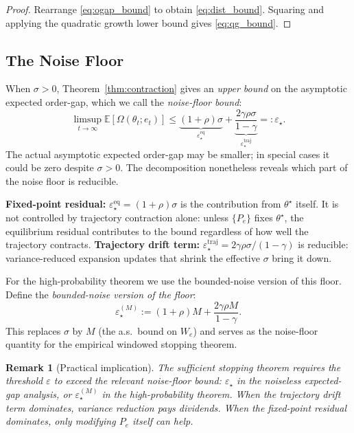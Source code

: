 \documentclass[12pt,a4paper]{article}
\newtheorem{remark}[definition]{Remark}
\newcommand{\Ogap}{\Omega}
\begin{document}
\begin{proof}
Rearrange \eqref{eq:ogap_bound} to obtain \eqref{eq:dist_bound}. Squaring
and applying the quadratic growth lower bound gives \eqref{eq:qg_bound}. \qedhere
\end{proof}

\subsection{The Noise Floor}
\label{sec:theory_noisefloor}

When $\sigma > 0$, Theorem~\ref{thm:contraction} gives an \emph{upper bound}
on the asymptotic expected order-gap, which we call the \emph{noise-floor bound}:
\[
  \limsup_{t \to \infty}
  \mathbb{E}[\Ogap(\theta_t; e_t)]
  \leq \underbrace{(1 + \rho)\sigma}_{\varepsilon_\star^{\text{eq}}}
  + \underbrace{\frac{2\gamma\rho\sigma}{1 - \gamma}}_{\varepsilon_\star^{\text{traj}}}
  =: \varepsilon_\star.
\]
The actual asymptotic expected order-gap may be smaller; in special cases it
could be zero despite $\sigma > 0$. The decomposition nonetheless reveals
which part of the noise floor is reducible.

\textbf{Fixed-point residual:}
$\varepsilon_\star^{\text{eq}} = (1+\rho)\sigma$ is the contribution from
$\theta^\star$ itself. It is not controlled by trajectory contraction alone:
unless $\{P_e\}$ fixes $\theta^\star$, the equilibrium residual contributes
to the bound regardless of how well the trajectory contracts.
\textbf{Trajectory drift term:} $\varepsilon_\star^{\text{traj}} =
2\gamma\rho\sigma/(1-\gamma)$ is reducible: variance-reduced expansion
updates that shrink the effective $\sigma$ bring it down.

For the high-probability theorem we use the bounded-noise version of this floor.
Define the \emph{bounded-noise version of the floor}:
\begin{equation}
\label{eq:hp_floor}
\varepsilon_\star^{(M)} := (1+\rho)M + \frac{2\gamma\rho M}{1-\gamma}.
\end{equation}
This replaces $\sigma$ by $M$ (the a.s.\ bound on $W_e$) and serves as the
noise-floor quantity for the empirical windowed stopping theorem.

\begin{remark}[Practical implication]
\label{rem:practical_floor}
The sufficient stopping theorem requires the threshold $\varepsilon$ to exceed
the relevant noise-floor bound: $\varepsilon_\star$ in the noiseless expected-gap analysis,
or $\varepsilon_\star^{(M)}$ in the high-pro\-ba\-bil\-i\-ty theorem.
When the trajectory drift term dominates, variance reduction
pays dividends. When the fixed-point residual dominates, only modifying $P_e$
itself can help.
\end{remark}
\end{document}
